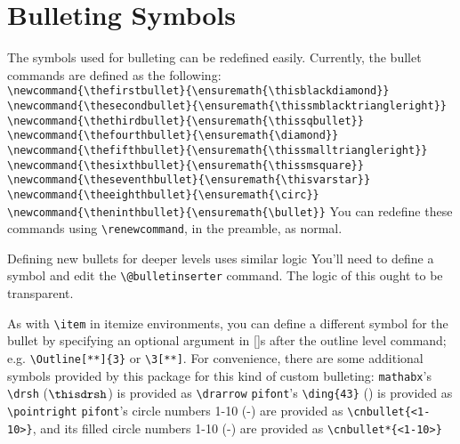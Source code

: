 \documentclass[11pt]{article}
\begin{document}
\newpage

\section{Bulleting Symbols}\label{sec: bullets}
\1 The symbols used for bulleting can be redefined easily.
	\2 Currently, the bullet commands are defined as the following:\\
		\verb+\newcommand{\thefirstbullet}{\ensuremath{\thisblackdiamond}}+\\
		\verb+\newcommand{\thesecondbullet}{\ensuremath{\thissmblacktriangleright}}+\\
		\verb+\newcommand{\thethirdbullet}{\ensuremath{\thissqbullet}}+\\
		\verb+\newcommand{\thefourthbullet}{\ensuremath{\diamond}}+\\
		\verb+\newcommand{\thefifthbullet}{\ensuremath{\thissmalltriangleright}}+\\
		\verb+\newcommand{\thesixthbullet}{\ensuremath{\thissmsquare}}+\\
		\verb+\newcommand{\theseventhbullet}{\ensuremath{\thisvarstar}}+\\
		\verb+\newcommand{\theeighthbullet}{\ensuremath{\circ}}+\\
		\verb+\newcommand{\theninthbullet}{\ensuremath{\bullet}}+
	\2 You can redefine these commands using \verb+\renewcommand+, in the preamble, as normal.

\1 Defining new bullets for deeper levels uses similar logic
	\2 You'll need to define a symbol and edit the \verb+\@bulletinserter+ command.
	\2 The logic of this ought to be transparent.

\1 As with \verb+\item+ in itemize environments, you can define a different symbol for the bullet by specifying an optional argument in []s after the outline level command; e.g. \verb+\Outline[**]{3}+ or \verb+\3[**]+.
	\2 For convenience, there are some additional symbols provided by this package for this kind of custom bulleting:
		\3[\drarrow] \verb+mathabx+'s \verb+\drsh+ (\ensuremath{\thisdrsh}) is provided as \verb+\drarrow+
		\3[\pointright] \verb+pifont+'s \verb+\ding{43}+ (\pointright) is provided as \verb+\pointright+
		\3[\cnbullet{3}] \verb+pifont+'s circle numbers 1-10 (-) are provided as \verb+\cnbullet{<1-10>}+, and its filled circle numbers 1-10 (-) are provided as \verb+\cnbullet*{<1-10>}+
\end{document}
